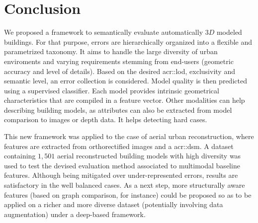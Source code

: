\documentclass[runningheads]{llncs}
\begin{document}
\section{Conclusion}
\label{sec::conclusion}

We proposed a framework to semantically evaluate automatically 3$D$ modeled buildings. For that purpose, errors are hierarchically organized into a flexible and parametrized taxonomy. It aims to handle the large diversity of urban enviroments and varying requirements stemming from end-users (geometric accuracy and level of details). Based on the desired \acrshort{acr::lod}, exclusivity and semantic level, an error collection is considered. Model quality is then predicted using a supervised classifier. Each model provides intrinsic geometrical characteristics that are compiled in a feature vector. Other modalities can help describing building models, as attributes can also be extracted from model comparison to images or depth data. It helps detecting hard cases.

This new framework was applied to the case of aerial urban reconstruction, where features are extracted from orthorectified images and a \acrshort{acr::dsm}. A dataset containing $1,501$ aerial reconstructed building models with high diversity was used to test the devised evaluation method associated to multimodal baseline features. Although being mitigated over under-represented errors, results are satisfactory in the well balanced cases. As a next step, more structurally aware features (based on graph comparison, for instance) could be proposed so as to be applied on a richer and more diverse dataset (potentially involving data augmentation) under a deep-based framework.


\end{document}
